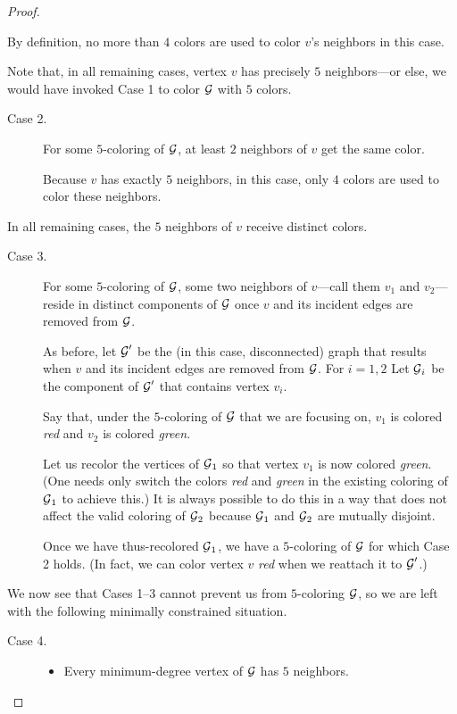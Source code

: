 \begin{proof}
\begin{description}
\smallskip

By definition, no more than $4$ colors are used to color $v$'s neighbors in this case.
\end{description}
Note that, in all remaining cases, vertex $v$ has precisely $5$ neighbors---or else, we would have invoked Case 1 to color $\mbox{$\cal G$}$ with $5$ colors.
\begin{description}
\item[{\sf Case 2}.]
For some $5$-coloring of $\mbox{$\cal G$}$, at least $2$ neighbors of $v$ get the same color.

\smallskip

Because $v$ has exactly $5$ neighbors, in this case, only $4$ colors are used to color these neighbors.
\end{description}
In all remaining cases, the $5$ neighbors of $v$ receive distinct colors.
\begin{description}
\item[{\sf Case 3}.]
For some $5$-coloring of $\mbox{$\cal G$}$, some two neighbors of $v$---call them $v_1$ and $v_2$---reside in distinct components of $\mbox{$\cal G$}$ once $v$ and its incident edges are removed from $\mbox{$\cal G$}$.

\smallskip

As before, let $\mbox{$\cal G$}'$ be the (in this case, disconnected) graph that results when $v$ and its incident edges are removed from $\mbox{$\cal G$}$.  For $i = 1,2$ Let $\mbox{$\cal G$}_i$ be the component of $\mbox{$\cal G$}'$ that contains vertex $v_i$.

Say that, under the $5$-coloring of $\mbox{$\cal G$}$ that we are focusing on, $v_1$ is colored {\it red} and $v_2$ is colored {\it green}.

\smallskip

Let us recolor the vertices of $\mbox{$\cal G$}_1$ so that vertex $v_1$ is now colored {\it green}.  (One needs only switch the colors {\it red} and {\it green} in the existing coloring of $\mbox{$\cal G$}_1$ to achieve this.)  It is always possible to do this in a way that does not affect the valid coloring of $\mbox{$\cal G$}_2$ because $\mbox{$\cal G$}_1$ and $\mbox{$\cal G$}_2$ are mutually disjoint.

\smallskip

Once we have thus-recolored $\mbox{$\cal G$}_1$, we have a $5$-coloring of $\mbox{$\cal G$}$ for which Case 2 holds.  (In fact, we can color vertex $v$ {\em red} when we reattach it to $\mbox{$\cal G$}'$.)
\end{description}

\smallskip

\noindent
We now see that Cases 1--3 cannot prevent us from $5$-coloring $\mbox{$\cal G$}$, so we are left with the following minimally constrained situation.
\begin{description}
\item[{\sf Case 4}.]
\begin{itemize}
\item
Every minimum-degree vertex of $\mbox{$\cal G$}$ has $5$ neighbors.


\end{itemize}
\end{description}
\end{proof}

